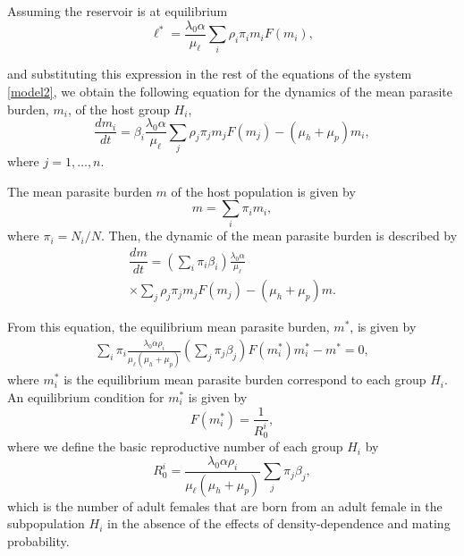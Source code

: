 \documentclass[eng]{MMSB-class-eng}
\begin{document}
Assuming the reservoir is at equilibrium 
\begin{equation}
\ell^*=\frac{  \lambda_0 \alpha }{\mu_{\ell}}   \sum_i \rho_{i} \pi_{i} m_{i} F(m_{i}), 
\end{equation} 
{\color{red}
and substituting this expression in the rest of the equations of the system \eqref{model2}, we obtain the following equation for the dynamics of the mean parasite burden, $m_{i}$, of the host group $H_{i}$,
\begin{equation}\label{dmi}
\dfrac{dm_{i}}{dt}=\beta_{i} \frac{\lambda_0\alpha}{ \mu_{\ell} }  
\sum_j     \rho_{j} \pi_j  m_{j} F(m_{j})
- (\mu_h+\mu_p) m_{i},
\end{equation}
where $j=1,\ldots,n$.

The mean parasite burden $m$ of the host population is given by
\begin{equation}
m=\sum_i \pi_i m_{i}, 
\end{equation}
where $\pi_i=N_i/N$.
Then, the dynamic of the mean parasite burden is described by
\begin{multline}
	\dfrac{dm}{dt}= %
	\left(  \sum_i \pi_i \beta_{i} \right)
	\frac{ \lambda_0 \alpha }{\mu_{\ell}}\\  
	\times \sum_j \rho_{j} \pi_{j} m_{j} F(m_{j})   -(\mu_{h}+\mu_p) m .%
\end{multline}

From this equation, the equilibrium mean parasite burden, $m^*$, is given by
\begin{multline}
	\sum_i \pi_i \frac{ \lambda_0 \alpha \rho_{i}}{\mu_{\ell}(\mu_{h}+\mu_p)} 
	\left( \sum_j \pi_{j} \beta_{j} \right)
	F( m^*_{i}) m^*_{i}
	- m^*=0, 
\end{multline}
where $m_{i}^*$ is the equilibrium mean parasite burden correspond to each group $H_{i}$.
An equilibrium condition for 
$m_{i}^*$
is given by
\begin{equation}%
F(m^*_{i})=\dfrac{1}{R_0^{i}},
\end{equation}
where we define the basic reproductive number of each group $H_i$ by
\begin{equation}%
R_0^{i}=\frac{ \lambda_0 \alpha \rho_{i}}{ \mu_{\ell} (\mu_{h}+\mu_p)}  \sum_j \pi_j\beta_{j} ,
\end{equation}
which is the number of adult females that are born from an adult female in the subpopulation $H_i$ in the absence of the effects of density-dependence and  mating probability. 

}
\end{document}
